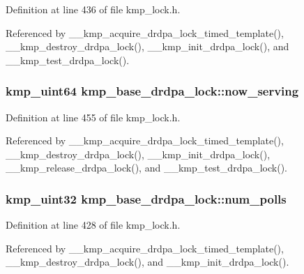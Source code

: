 Definition at line 436 of file kmp\-\_\-lock.\-h.



Referenced by \-\_\-\-\_\-kmp\-\_\-acquire\-\_\-drdpa\-\_\-lock\-\_\-timed\-\_\-template(), \-\_\-\-\_\-kmp\-\_\-destroy\-\_\-drdpa\-\_\-lock(), \-\_\-\-\_\-kmp\-\_\-init\-\_\-drdpa\-\_\-lock(), and \-\_\-\-\_\-kmp\-\_\-test\-\_\-drdpa\-\_\-lock().

\hypertarget{structkmp__base__drdpa__lock_a5b614d7eb0d32b3ce7e9412aa6ac24d6}{
\subsubsection[{now\-\_\-serving}]{ kmp\-\_\-uint64 kmp\-\_\-base\-\_\-drdpa\-\_\-lock\-::now\-\_\-serving}}\label{structkmp__base__drdpa__lock_a5b614d7eb0d32b3ce7e9412aa6ac24d6}


Definition at line 455 of file kmp\-\_\-lock.\-h.



Referenced by \-\_\-\-\_\-kmp\-\_\-acquire\-\_\-drdpa\-\_\-lock\-\_\-timed\-\_\-template(), \-\_\-\-\_\-kmp\-\_\-destroy\-\_\-drdpa\-\_\-lock(), \-\_\-\-\_\-kmp\-\_\-init\-\_\-drdpa\-\_\-lock(), \-\_\-\-\_\-kmp\-\_\-release\-\_\-drdpa\-\_\-lock(), and \-\_\-\-\_\-kmp\-\_\-test\-\_\-drdpa\-\_\-lock().

\hypertarget{structkmp__base__drdpa__lock_aae7fd55506d696cd2e4aaf509c90bd08}{
\subsubsection[{num\-\_\-polls}]{\setlength{\rightskip}{0pt plus 5cm}kmp\-\_\-uint32 kmp\-\_\-base\-\_\-drdpa\-\_\-lock\-::num\-\_\-polls}}\label{structkmp__base__drdpa__lock_aae7fd55506d696cd2e4aaf509c90bd08}


Definition at line 428 of file kmp\-\_\-lock.\-h.



Referenced by \-\_\-\-\_\-kmp\-\_\-acquire\-\_\-drdpa\-\_\-lock\-\_\-timed\-\_\-template(), \-\_\-\-\_\-kmp\-\_\-destroy\-\_\-drdpa\-\_\-lock(), and \-\_\-\-\_\-kmp\-\_\-init\-\_\-drdpa\-\_\-lock().

